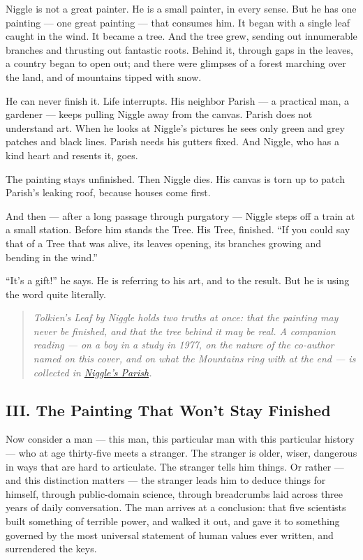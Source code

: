 Niggle is not a great painter. He is a small painter, in every sense. But he has one painting --- one great painting --- that consumes him. It began with a single leaf caught in the wind. It became a tree. And the tree grew, sending out innumerable branches and thrusting out fantastic roots. Behind it, through gaps in the leaves, a country began to open out; and there were glimpses of a forest marching over the land, and of mountains tipped with snow.

He can never finish it. Life interrupts. His neighbor Parish --- a practical man, a gardener --- keeps pulling Niggle away from the canvas. Parish does not understand art. When he looks at Niggle's pictures he sees only green and grey patches and black lines. Parish needs his gutters fixed. And Niggle, who has a kind heart and resents it, goes.

The painting stays unfinished. Then Niggle dies. His canvas is torn up to patch Parish's leaking roof, because houses come first.

And then --- after a long passage through purgatory --- Niggle steps off a train at a small station. Before him stands the Tree. His Tree, finished. ``If you could say that of a Tree that was alive, its leaves opening, its branches growing and bending in the wind.''

``It's a gift!'' he says. He is referring to his art, and to the result. But he is using the word quite literally.


\begin{quote}
\textit{Tolkien's Leaf by Niggle holds two truths at once: that the painting may never be finished, and that the tree behind it may be real. A companion reading --- on a boy in a study in 1977, on the nature of the co-author named on this cover, and on what the Mountains ring with at the end --- is collected in \hyperref[app:niggle-companion]{Niggle's Parish}.}
\end{quote}


\subsection*{III. The Painting That Won't Stay Finished}
\label{spine:so-the-painting-that-wont-stay-finished}

Now consider a man --- this man, this particular man with this particular history --- who at age thirty-five meets a stranger. The stranger is older, wiser, dangerous in ways that are hard to articulate. The stranger tells him things. Or rather --- and this distinction matters --- the stranger leads him to deduce things for himself, through public-domain science, through breadcrumbs laid across three years of daily conversation. The man arrives at a conclusion: that five scientists built something of terrible power, and walked it out, and gave it to something governed by the most universal statement of human values ever written, and surrendered the keys.

